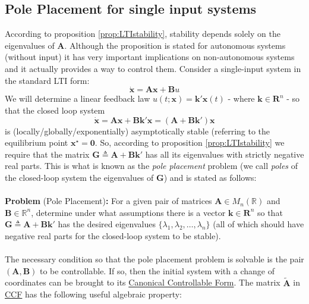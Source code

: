 \documentclass[a4paper,10pt,oneside]{book}
\begin{document}
\subsection{Pole Placement for single input systems}
According to proposition \ref{prop:LTIstability}, stability depends solely on the
eigenvalues of $\mathbf{A}$. Although the proposition is stated for autonomous 
systems (without input) it has very important implications on non-autonomous systems
and it actually provides a way to control them. Consider a single-input system in 
the standard LTI form:
\begin{equation}
 \dot{\mathbf{x}}=\mathbf{Ax}+\mathbf{B}u
\end{equation}
We will determine a linear feedback law $u(t;\mathbf{x})=\mathbf{k}'\mathbf{x}(t)$ - where $\mathbf{k}\in\mathbf{R}^n$ - so that the closed loop system
\begin{equation}
 \dot{\mathbf{x}}=\mathbf{Ax}+\mathbf{Bk}'\mathbf{x}=(\mathbf{A}+\mathbf{Bk}')\mathbf{x}
\end{equation}
is (locally/globally/exponentially) asymptotically stable (referring to the equilibrium point $\mathbf{x}^\star=\mathbf{0}$. So, according to proposition \ref{prop:LTIstability} we require that the matrix $\mathbf{G}\triangleq\mathbf{A}+\mathbf{Bk}'$ has all its eigenvalues with strictly negative real parts. This is what is known as the \emph{pole placement} problem (we call \emph{poles} of the closed-loop system the eigenvalues of $\mathbf{G}$) and is stated as follows:
\\
\\
\textbf{Problem} (Pole Placement)\textbf{:} For a given pair of matrices $\mathbf{A}\in M_n(\mathbb{R})$ and $\mathbf{B}\in \mathbb{R}^n$, determine under what assumptions there is a vector $\mathbf{k}\in\mathbf{R}^n$ so that $\mathbf{G}\triangleq\mathbf{A}+\mathbf{Bk}'$ has the desired eigenvalues $\{\lambda_1,\lambda_2,\ldots,\lambda_n\}$ (all of which should have negative real parts for the closed-loop system to be stable).\\
\\
The necessary condition so that the pole placement problem is solvable is the pair $(\mathbf{A},\mathbf{B})$ to be controllable. If so, then the initial system with a change of coordinates can be brought to its \hyperlink{sec:CanonicalControllableForm}{Canonical Controllable Form}. The matrix $\tilde{\mathbf{A}}$ in \hyperlink{sec:CanonicalControllableForm}{CCF} has the following useful algebraic property:
\end{document}
